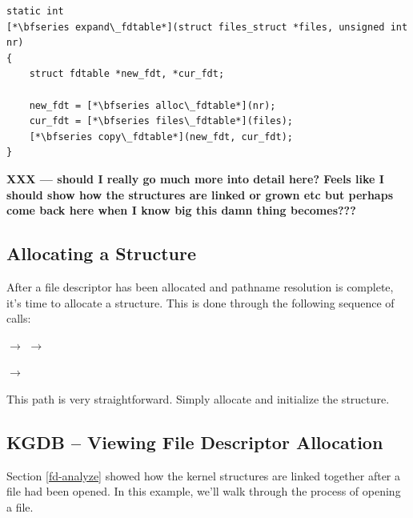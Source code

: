 \begin{lstlisting}
static int 
[*\bfseries expand\_fdtable*](struct files_struct *files, unsigned int nr)
{
    struct fdtable *new_fdt, *cur_fdt;

    new_fdt = [*\bfseries alloc\_fdtable*](nr);
    cur_fdt = [*\bfseries files\_fdtable*](files);
    [*\bfseries copy\_fdtable*](new_fdt, cur_fdt);
}
\end{lstlisting}

\noindent
\textbf{XXX --- should I really go much more into detail here? Feels like I should show how the structures are linked or grown etc but perhaps come back here when I know big this damn thing becomes???}


\subsection{Allocating a  Structure}\label{filetable-expand}

After a file descriptor has been allocated and pathname resolution is complete, it's time to allocate a  structure. This is done through the following sequence of calls:

\small
\bigskip 
{} $\rightarrow$  $\rightarrow$ 

\vspace{1pt}
\hspace{1.37in}$\rightarrow$ 
    
\bigskip
\normalsize

\noindent
This path is very straightforward. Simply allocate and initialize the structure.


\subsection{KGDB -- Viewing File Descriptor Allocation}

Section \ref{fd-analyze} showed how the kernel structures are linked together after a file had been opened. In this example, we'll walk through the process of opening a file.

